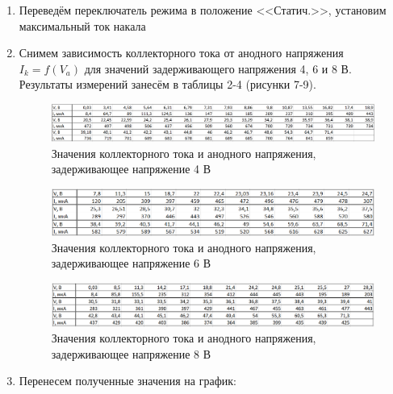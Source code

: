 \documentclass[a4paper, 12pt]{article}%
\begin{document}
\begin{enumerate}
    \item Переведём переключатель режима в положение <<Статич.>>, установим максимальный ток накала
    \item Снимем зависимость коллекторного тока от анодного напряжения $I_k = f(V_a)$ для значений задерживающего напряжения 4, 6 и 8 В. Результаты измерений занесём в таблицы 2-4 (рисунки 7-9).
    
    \begin{figure}[h]
    \centering
    \includegraphics[width=0.9\linewidth]{images/4_V.PNG}
    \caption{Значения коллекторного тока и анодного напряжения, задерживающее напряжение 4 В}
    \label{fig:vac}
\end{figure}

\begin{figure}[h]
    \centering
    \includegraphics[width=0.9\linewidth]{images/6_V.PNG}
    \caption{Значения коллекторного тока и анодного напряжения, задерживающее напряжение 6 В}
    \label{fig:vac}
\end{figure}

\begin{figure}[h]
    \centering
    \includegraphics[width=0.9\linewidth]{images/8_V.PNG}
    \caption{Значения коллекторного тока и анодного напряжения, задерживающее напряжение 8 В}
    \label{fig:vac}
\end{figure}

\item Перенесем полученные значения на график:


\end{enumerate}
\end{document}

